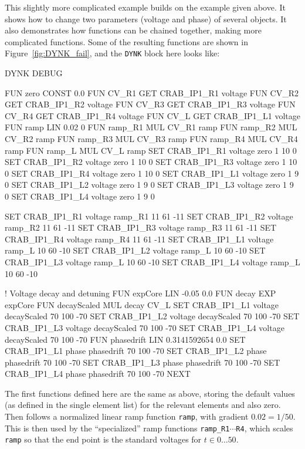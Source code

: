 This slightly more complicated example builds on the example given above.
It shows how to change two parameters (voltage and phase) of several objects.
It also demonstrates how functions can be chained together, making more complicated functions.
Some of the resulting functions are shown in Figure~\ref{fig:DYNK_fail}, and the \texttt{DYNK} block here looks like:
\begin{cverbatim}
DYNK
  DEBUG

  FUN zero CONST 0.0
  FUN CV_R1 GET CRAB_IP1_R1 voltage
  FUN CV_R2 GET CRAB_IP1_R2 voltage
  FUN CV_R3 GET CRAB_IP1_R3 voltage
  FUN CV_R4 GET CRAB_IP1_R4 voltage
  FUN CV_L  GET CRAB_IP1_L1 voltage
  FUN ramp LIN 0.02 0
  FUN ramp_R1 MUL CV_R1 ramp
  FUN ramp_R2 MUL CV_R2 ramp
  FUN ramp_R3 MUL CV_R3 ramp
  FUN ramp_R4 MUL CV_R4 ramp
  FUN ramp_L  MUL CV_L  ramp
  SET CRAB_IP1_R1 voltage zero 1 10 0
  SET CRAB_IP1_R2 voltage zero 1 10 0
  SET CRAB_IP1_R3 voltage zero 1 10 0
  SET CRAB_IP1_R4 voltage zero 1 10 0
  SET CRAB_IP1_L1 voltage zero 1 9 0
  SET CRAB_IP1_L2 voltage zero 1 9 0
  SET CRAB_IP1_L3 voltage zero 1 9 0
  SET CRAB_IP1_L4 voltage zero 1 9 0

  SET CRAB_IP1_R1 voltage ramp_R1 11 61 -11
  SET CRAB_IP1_R2 voltage ramp_R2 11 61 -11
  SET CRAB_IP1_R3 voltage ramp_R3 11 61 -11
  SET CRAB_IP1_R4 voltage ramp_R4 11 61 -11
  SET CRAB_IP1_L1 voltage ramp_L 10 60 -10
  SET CRAB_IP1_L2 voltage ramp_L 10 60 -10
  SET CRAB_IP1_L3 voltage ramp_L 10 60 -10
  SET CRAB_IP1_L4 voltage ramp_L 10 60 -10

  ! Voltage decay and detuning
  FUN expCore LIN -0.05 0.0
  FUN decay EXP expCore
  FUN decayScaled MUL decay CV_L
  SET CRAB_IP1_L1 voltage decayScaled 70 100 -70
  SET CRAB_IP1_L2 voltage decayScaled 70 100 -70
  SET CRAB_IP1_L3 voltage decayScaled 70 100 -70
  SET CRAB_IP1_L4 voltage decayScaled 70 100 -70
  FUN phasedrift LIN 0.3141592654 0.0
  SET CRAB_IP1_L1 phase phasedrift 70 100 -70
  SET CRAB_IP1_L2 phase phasedrift 70 100 -70
  SET CRAB_IP1_L3 phase phasedrift 70 100 -70
  SET CRAB_IP1_L4 phase phasedrift 70 100 -70
NEXT
\end{cverbatim}
The first functions defined here are the same as above, storing the default values (as defined in the single element list) for the relevant elements and also zero.
Then follows a normalized linear ramp function \texttt{ramp}, with gradient $0.02 = 1/50$.
This is then used by the ``specialized'' ramp functions \texttt{ramp\_R1$\cdots$R4}, which scales \texttt{ramp} so that the end point is the standard voltages for $t\in 0\ldots50$.

